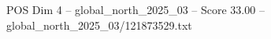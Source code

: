 \begin{textsample}{POS Dim 4 – global\_north\_2025\_03 – Score 33.00 – global\_north\_2025\_03/121873529.txt}
\end{textsample}
